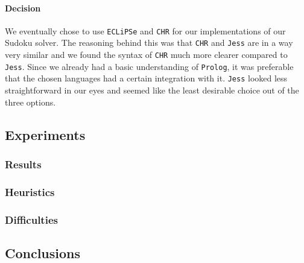 \paragraph*{Decision}
We eventually chose to use \texttt{ECLiPSe} and \texttt{CHR} for our implementations of our Sudoku solver.
The reasoning behind this was that \texttt{CHR} and \texttt{Jess} are in a way very similar and we found the syntax of \texttt{CHR} much more clearer compared to \texttt{Jess}.
Since we already had a basic understanding of \texttt{Prolog}, it was preferable that the chosen languages had a certain integration with it.
\texttt{Jess} looked less straightforward in our eyes and seemed like the least desirable choice out of the three options.

\subsection{Experiments}\label{subsec:sudokuexperiments}
\subsubsection{Results}
\subsubsection{Heuristics}
\subsubsection{Difficulties}

\subsection{Conclusions}


